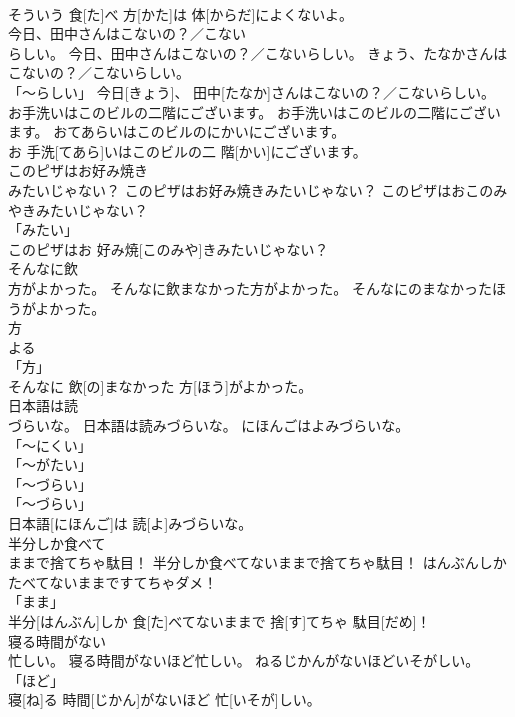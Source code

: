 \documentclass[8pt]{extreport}
\begin{document}
\begin{CJK}{UTF8}{min}
\\	そういう 食[た]べ 方[かた]は 体[からだ]によくないよ。		
\\	今日、田中さんはこないの？／こない
\\	らしい。	今日、田中さんはこないの？／こないらしい。	きょう、たなかさんはこないの？／こないらしい。	
\\	「～らしい」	今日[きょう]、 田中[たなか]さんはこないの？／こないらしい。		
\\	お手洗いはこのビルの二階にございます。	お手洗いはこのビルの二階にございます。	おてあらいはこのビルのにかいにございます。	
\\	お 手洗[てあら]いはこのビルの二 階[かい]にございます。		
\\	このピザはお好み焼き
\\	みたいじゃない？	このピザはお好み焼きみたいじゃない？	このピザはおこのみやきみたいじゃない？	
\\	「みたい」 
\\	このピザはお 好み焼[このみや]きみたいじゃない？		
\\	そんなに飲
\\	方がよかった。	そんなに飲まなかった方がよかった。	そんなにのまなかったほうがよかった。	
\\	方 
\\	よる 
\\	「方」 
\\	そんなに 飲[の]まなかった 方[ほう]がよかった。		
\\	日本語は読
\\	づらいな。	日本語は読みづらいな。	にほんごはよみづらいな。	
\\	「～にくい」 
\\	「～がたい」 
\\	「～づらい」 
\\	「～づらい」 
\\	日本語[にほんご]は 読[よ]みづらいな。		
\\	半分しか食べて
\\	ままで捨てちゃ駄目！	半分しか食べてないままで捨てちゃ駄目！	はんぶんしかたべてないままですてちゃダメ！	
\\	「まま」 
\\	半分[はんぶん]しか 食[た]べてないままで 捨[す]てちゃ 駄目[だめ]！		
\\	寝る時間がない
\\	忙しい。	寝る時間がないほど忙しい。	ねるじかんがないほどいそがしい。	
\\	「ほど」 
\\	寝[ね]る 時間[じかん]がないほど 忙[いそが]しい。		

\end{CJK}
\end{document}
